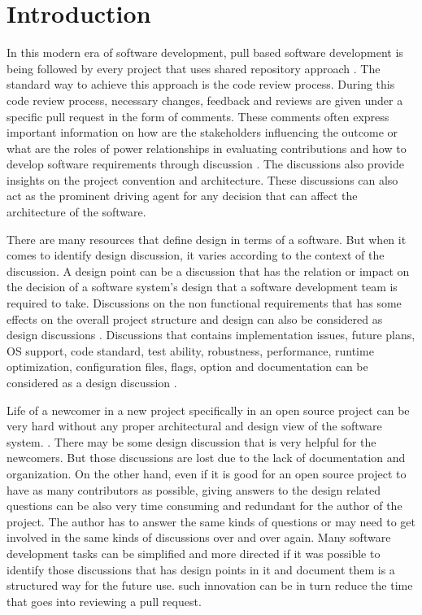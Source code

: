 \section{Introduction}
\label{sect:introduction}

In this modern era of software development, pull based software development is being followed by every project that uses shared repository approach \cite{Gousios2014}. The standard way to achieve this approach is the code review process. During this code review process, necessary changes, feedback and reviews are given under a specific pull request in the form of comments. These comments often express important information on how are the stakeholders influencing the outcome or what are the roles of power relationships in evaluating contributions and how to develop software requirements through discussion \cite{Tsay2014}. The discussions also provide insights on the project convention and architecture. These discussions can also act as the prominent driving agent for any decision that can affect the architecture of the software.

There are many resources that define design in terms of a software. But when it comes to identify design discussion, it varies according to the context of the discussion. A design point \cite{Viviani2018} can be a discussion that has the relation or impact on the decision of a software system's design that a software development team is required to take. Discussions on the non functional requirements that has some effects on the overall project structure and design can also be considered as design discussions \cite{Sousa2018}. Discussions that contains implementation issues, future plans, OS support, code standard, test ability, robustness, performance, runtime optimization, configuration files, flags, option and documentation can be considered as a design discussion \cite{Viviani2018}.

Life of a newcomer in a new project specifically in an open source project can be very hard without any proper architectural and design view of the software system. \cite{Steinmacher2014}. There may be some design discussion that is very helpful for the newcomers. But those discussions are lost due to the lack of documentation and organization. On the other hand, even if it is good for an open source project to have as many contributors as possible, giving answers to the design related questions can be also very time consuming and redundant for the author of the project. The author has to answer the same kinds of questions or may need to get involved in the same kinds of discussions over and over again. Many software development tasks can be simplified and more directed if it was possible to identify those discussions that has design points in it and document them is a structured way for the future use. such innovation can be in turn reduce the time that goes into reviewing a pull request.

